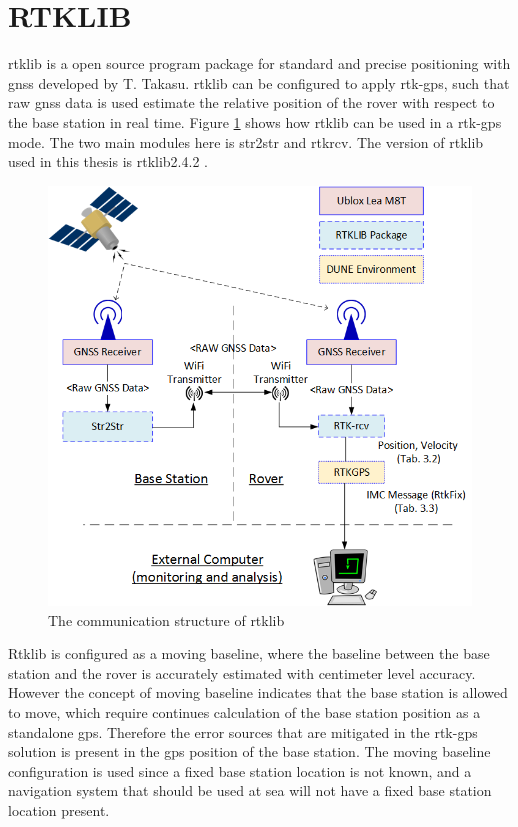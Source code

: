 \section{RTKLIB}\label{ss:Rtklib}
\acrfull{rtklib}\citep{takasu2009development} is a open source program package for standard and precise positioning with \gls{gnss} developed by T. Takasu. \gls{rtklib} can be configured to apply \gls{rtk-gps}, such that raw \gls{gnss} data is used estimate the relative position of the rover with respect to the base station in real time. Figure \ref{figure:RTKLIB_STRUCTURE} shows how \gls{rtklib} can be used in a \gls{rtk-gps} mode. The two main modules here is str2str and rtkrcv. The version of \gls{rtklib} used in this thesis is \gls{rtklib}2.4.2 \citep{Rtklib242}.
\begin{figure}[H]
	\centering
		\includegraphics[width=1\textwidth]{figs/RTKLIB.png}
		\caption{The communication structure of \gls{rtklib}}
		\label{figure:RTKLIB_STRUCTURE}
\end{figure}
Rtklib is configured as a moving baseline, where the baseline between the base station and the rover is accurately estimated with centimeter level accuracy. However the concept of moving baseline indicates that the base station is allowed to move, which require continues calculation of the base station position as a standalone \gls{gps}. Therefore the error sources that are mitigated in the \gls{rtk-gps} solution is present in the \gls{gps} position of the base station. The moving baseline configuration is used since a fixed base station location is not known, and a navigation system that should be used at sea will not have a fixed base station location present.
